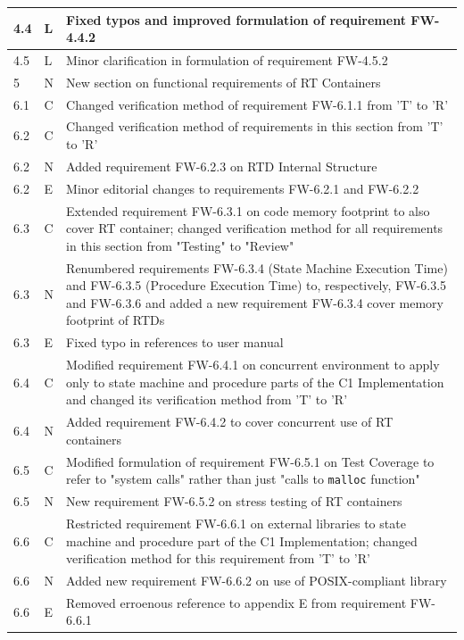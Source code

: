 \documentclass[requirements]{../fwprofile}
\begin{document}
\begin{longtable}{|p{1.5cm}|p{1cm}|p{8cm}|}
\hline
4.4 & L & Fixed typos and improved formulation of requirement FW-4.4.2 \\
\hline
4.5 & L & Minor clarification in formulation of requirement FW-4.5.2 \\
\hline
5 & N & New section on functional requirements of RT Containers \\
\hline
6.1 & C & Changed verification method of requirement FW-6.1.1 from 'T' to 'R' \\
\hline
6.2 & C & Changed verification method of requirements in this section from 'T' to 'R' \\
\hline
6.2 & N & Added requirement FW-6.2.3 on RTD Internal Structure \\
\hline
6.2 & E & Minor editorial changes to requirements FW-6.2.1 and FW-6.2.2 \\
\hline
6.3 & C & Extended requirement FW-6.3.1 on code memory footprint to also cover RT container; changed verification method for all requirements in this section from "Testing" to "Review" \\
\hline
6.3 & N & Renumbered requirements FW-6.3.4 (State Machine Execution Time) and FW-6.3.5 (Procedure Execution Time) to, respectively, FW-6.3.5 and FW-6.3.6 and added a new requirement FW-6.3.4 cover memory footprint of RTDs \\
\hline
6.3 & E & Fixed typo in references to user manual \\
\hline
6.4 & C & Modified requirement FW-6.4.1 on concurrent environment to apply only to state machine and procedure parts of the C1 Implementation and changed its verification method from 'T' to 'R' \\
\hline
6.4 & N & Added requirement FW-6.4.2 to cover concurrent use of RT containers \\
\hline
6.5 & C & Modified formulation of requirement FW-6.5.1 on Test Coverage to refer to "system calls" rather than just "calls to \texttt{malloc} function"\\
\hline
6.5 & N & New requirement FW-6.5.2 on stress testing of RT containers \\
\hline
6.6 & C & Restricted requirement FW-6.6.1 on external libraries to state machine and procedure part of the C1 Implementation; changed verification method for this requirement  from 'T' to 'R' \\
\hline
6.6 & N & Added new requirement FW-6.6.2 on use of POSIX-compliant library \\
\hline
6.6 & E & Removed erroenous reference to appendix E from requirement FW-6.6.1 \\

\end{longtable}
\end{document}
